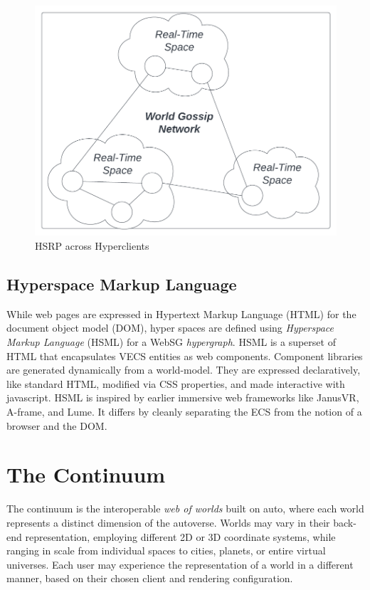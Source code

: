 \documentclass[twocolumn, 10pt]{article}
\begin{document}
 \begin{figure}
    \centering
    \includegraphics{images/hsrp.png}
    \caption{HSRP across Hyperclients}
    \label{fig:my_label}
\end{figure}

\subsection{Hyperspace Markup Language}

While web pages are expressed in Hypertext Markup Language (HTML) for the document object model (DOM), hyper spaces are defined using \textit{Hyperspace Markup Language} (HSML) for a WebSG \textit{hypergraph}. HSML is a superset of HTML that encapsulates VECS entities as web components. Component libraries are generated dynamically from a world-model. They are expressed declaratively, like standard HTML, modified via CSS properties, and made interactive with javascript. HSML is inspired by earlier immersive web frameworks like JanusVR, A-frame, and Lume. It differs by cleanly separating the ECS from the notion of a browser and the DOM. 

\section{The Continuum}

The continuum is the interoperable \textit{web of worlds} built on auto, where each world represents a distinct dimension of the autoverse. Worlds may vary in their back-end representation, employing different 2D or 3D coordinate systems, while ranging in scale from individual spaces to cities, planets, or entire virtual universes. Each user may experience the representation of a world in a different manner, based on their chosen client and rendering configuration. 
\end{document}
